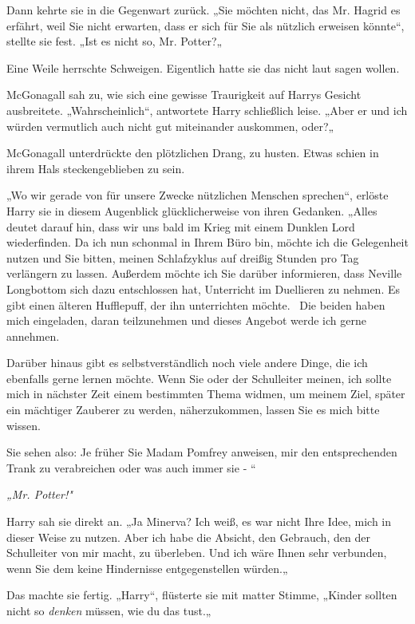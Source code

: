 {Dann kehrte sie in die Gegenwart zurück. „Sie möchten nicht, das Mr. Hagrid es erfährt, weil Sie nicht erwarten, dass er sich für Sie als nützlich erweisen könnte“, stellte sie fest. „Ist es nicht so, Mr. Potter?„

Eine Weile herrschte Schweigen. Eigentlich hatte sie das nicht laut sagen wollen.

McGonagall sah zu, wie sich eine gewisse Traurigkeit auf Harrys Gesicht ausbreitete. „Wahrscheinlich“, antwortete Harry schließlich leise. „Aber er und ich würden vermutlich auch nicht gut miteinander auskommen, oder?„

McGonagall unterdrückte den plötzlichen Drang, zu husten. Etwas schien in ihrem Hals steckengeblieben zu sein.

„Wo wir gerade von für unsere Zwecke nützlichen Menschen sprechen“, erlöste Harry sie in diesem Augenblick glücklicherweise von ihren Gedanken. „Alles deutet darauf hin, dass wir uns bald im Krieg mit einem Dunklen Lord wiederfinden. Da ich nun schonmal in Ihrem Büro bin, möchte ich die Gelegenheit nutzen und Sie bitten, meinen Schlafzyklus auf dreißig Stunden pro Tag verlängern zu lassen. Außerdem möchte ich Sie darüber informieren, dass Neville Longbottom sich dazu entschlossen hat, Unterricht im Duellieren zu nehmen. Es gibt einen älteren Hufflepuff, der ihn unterrichten möchte. ~Die beiden haben mich eingeladen, daran teilzunehmen und dieses Angebot werde ich gerne annehmen.

Darüber hinaus gibt es selbstverständlich noch viele andere Dinge, die ich ebenfalls gerne lernen möchte. Wenn Sie oder der Schulleiter meinen, ich sollte mich in nächster Zeit einem bestimmten Thema widmen, um meinem Ziel, später ein mächtiger Zauberer zu werden, näherzukommen, lassen Sie es mich bitte wissen.

Sie sehen also: Je früher Sie Madam Pomfrey anweisen, mir den entsprechenden Trank zu verabreichen oder was auch immer sie - “

\emph{\emph{„Mr. Potter!"}}

Harry sah sie direkt an. „Ja Minerva? Ich weiß, es war nicht Ihre Idee, mich in dieser Weise zu nutzen. Aber ich habe die Absicht, den Gebrauch, den der Schulleiter von mir macht, zu überleben. Und ich wäre Ihnen sehr verbunden, wenn Sie dem keine Hindernisse entgegenstellen würden.„

Das machte sie fertig. „Harry“, flüsterte sie mit matter Stimme, „Kinder sollten nicht so \emph{denken} müssen, wie du das tust.„

}
